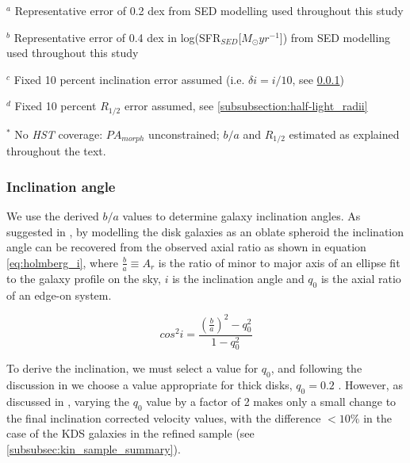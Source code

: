 \documentclass[fleqn,usenatbib]{mn2e}
\begin{document}
\begin{table*}
\begin{threeparttable}
\begin{tabular}{ccccccccccc}
\end{tabular}
\begin{tablenotes}
      \small
      \item $^{a}$ Representative error of 0.2 dex from SED modelling used throughout this study
      \item $^{b}$ Representative error of 0.4 dex in log(SFR$_{SED}$[$M_{\odot}yr^{-1}$]) from SED modelling used throughout this study
      \item $^{c}$ Fixed 10 percent inclination error assumed (i.e. $\delta i = i / 10$, see \protect\cref{subsubsection:inclination_angle})
      \item $^{d}$ Fixed 10 percent $R_{1/2}$ error assumed, see \protect\cref{subsubsection:half-light_radii}
      \item $^{*}$ No {\em HST} coverage: $PA_{morph}$ unconstrained; $b/a$ and $R_{1/2}$ estimated as explained throughout the text.
    \end{tablenotes}
  \end{threeparttable}
  \end{table*}


\subsubsection{Inclination angle}\label{subsubsection:inclination_angle}
We use the derived $b/a$ values to determine galaxy inclination angles.
As suggested in \cite{Holmberg1958}, by modelling the disk galaxies as an oblate spheroid the inclination angle can be recovered from the observed axial ratio as shown in equation \ref{eq:holmberg_i}, where $\frac{b}{a} \equiv A_{r}$ is the ratio of minor to major axis of an ellipse fit to the galaxy profile on the sky, $i$ is the inclination angle and $q_{0}$ is the axial ratio of an edge-on system.

\begin{equation}\label{eq:holmberg_i}
   cos^{2}i = \frac{\left(\frac{b}{a}\right)^{2} - q_{0}^{2}}{1 - q_{0}^{2}}
\end{equation}


To derive the inclination, we must select a value for $q_{0}$, and following the discussion in \citep{Law2012a} we choose a value appropriate for thick disks, $q_{0} = 0.2$ \citep[e.g.][]{Epinat2012,Harrison2017}.
However, as discussed in \cite{Harrison2017}, varying the $q_{0}$ value by a factor of 2 makes only a small change to the final inclination corrected velocity values, with the difference $<10\%$ in the case of the KDS galaxies in the refined sample (see \cref{subsubsec:kin_sample_summary}).
\end{document}
